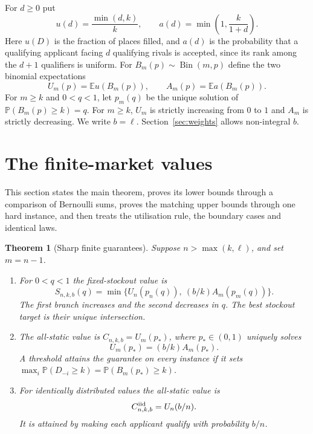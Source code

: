 \documentclass[11pt,a4paper]{article}
\newtheorem{thm}{Theorem}[section]
\theoremstyle{remark}
\newcommand{\E}{\mathbb E}
\newcommand{\Prob}{\mathbb P}
\newcommand{\Bin}{\operatorname{Bin}}
\begin{document}
For $d\ge0$ put
\[
 u(d)=\frac{\min(d,k)}k,\qquad a(d)=\min\!\left(1,\frac{k}{1+d}\right).
\]
Here $u(D)$ is the fraction of places filled, and $a(d)$ is the probability that a qualifying applicant facing $d$ qualifying rivals is accepted, since its rank among the $d+1$ qualifiers is uniform. For $B_m(p)\sim\Bin(m,p)$ define the two binomial expectations
\[
 U_m(p)=\E u(B_m(p)),\qquad A_m(p)=\E a(B_m(p)).
\]
For $m\ge k$ and $0<q<1$, let $p_m(q)$ be the unique solution of $\Prob(B_m(p)\ge k)=q$. For $m\ge k$, $U_m$ is strictly increasing from $0$ to $1$ and $A_m$ is strictly decreasing. We write $b=\ell$. Section~\ref{sec:weights} allows non-integral $b$.

\section{The finite-market values}\label{sec:finite}
This section states the main theorem, proves its lower bounds through a comparison of Bernoulli sums, proves the matching upper bounds through one hard instance, and then treats the utilisation rule, the boundary cases and identical laws.

\begin{thm}[Sharp finite guarantees]\label{thm:finite}
Suppose $n>\max(k,\ell)$, and set $m=n-1$.
\begin{enumerate}
\item For $0<q<1$ the fixed-stockout value is
\begin{equation}\label{eq:q}
 S_{n,k,b}(q)=\min\big\{U_n(p_n(q)),\ (b/k)A_m(p_m(q))\big\}.
\end{equation}
The first branch increases and the second decreases in $q$. The best stockout target is their unique intersection.
\item The all-static value is $C_{n,k,b}=U_m(p_*)$, where $p_*\in(0,1)$ uniquely solves
\begin{equation}\label{eq:balance}
 U_m(p_*)=(b/k)A_m(p_*).
\end{equation}
A threshold attains the guarantee on every instance if it sets $\max_i\Prob(D_{-i}\ge k)=\Prob(B_m(p_*)\ge k)$.
\item For identically distributed values the all-static value is
\begin{equation}\label{eq:iid}
 C^{\rm iid}_{n,k,b}=U_n(b/n).
\end{equation}
It is attained by making each applicant qualify with probability $b/n$.
\end{enumerate}
\end{thm}
\end{document}
